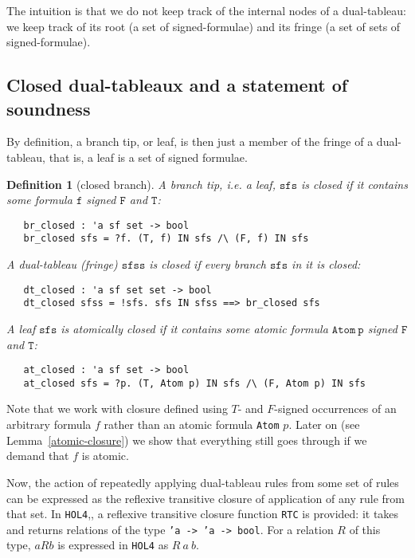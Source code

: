 \documentclass[a4paper]{article}
\newtheorem{definition}{Definition}
\newcommand{\hol}{\texttt{HOL4}}
\newcommand{\ie}{\textit{i.e. }}
\begin{document}
The intuition is that we do not keep track of the internal nodes of a
dual-tableau: we keep track of its root (a set of signed-formulae) and
its fringe (a set of sets of signed-formulae).

\subsection{Closed dual-tableaux and a statement of soundness}

By definition, a branch tip, or leaf, is then just a member of the fringe of a
dual-tableau, that is, a leaf is a set of signed formulae. 

\begin{definition}[closed branch]
\label{br-closed}\label{dt-closed}\label{at-closed}
  A branch tip, \ie a leaf, $\mathtt{sfs}$ is closed if it contains some
  formula $\mathtt{f}$ signed
  $\mathtt{F}$ and $\mathtt{T}$:
\begin{verbatim}
   br_closed : 'a sf set -> bool
   br_closed sfs = ?f. (T, f) IN sfs /\ (F, f) IN sfs 
\end{verbatim}

  A dual-tableau (fringe) $\mathtt{sfss}$ is closed if every 
  branch $\mathtt{sfs}$ in it is closed: 
\begin{verbatim}
   dt_closed : 'a sf set set -> bool
   dt_closed sfss = !sfs. sfs IN sfss ==> br_closed sfs 
\end{verbatim}

  A leaf $\mathtt{sfs}$ is atomically closed if it contains some atomic
  formula $\mathtt{Atom\ p}$ signed
  $\mathtt{F}$ and $\mathtt{T}$:
\begin{verbatim}
   at_closed : 'a sf set -> bool
   at_closed sfs = ?p. (T, Atom p) IN sfs /\ (F, Atom p) IN sfs
\end{verbatim}

\end{definition}

Note that we work with closure defined using $T$- and $F$-signed occurrences of
an arbitrary formula $f$ rather than an atomic formula \texttt{Atom} $p$.
Later on (see Lemma~\ref{atomic-closure}) we show
that everything still goes through if we demand that $f$ is atomic.

Now, the action of repeatedly applying dual-tableau rules from some set of
rules can be expressed as the reflexive transitive closure of
application of any rule from that set.
In \hol,, a reflexive transitive closure function \texttt{RTC} is provided:
it takes and returns relations of the type \texttt{'a -> 'a -> bool}.
For a relation $R$ of this type, $aRb$ is expressed in \hol{} as $R\ a\ b$.
%
\end{document}

